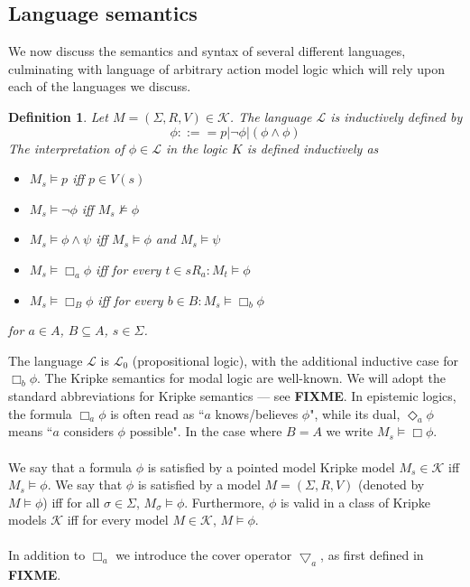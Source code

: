 \documentclass[12pt, a4paper, titlepage]{scrartcl}
\newtheorem{defn}{Definition}[subsection]
\numberwithin{equation}{section}
\newcommand{\cover}{\bigtriangledown}
\newcommand{\lang}{\mathcal{L}}
\newcommand{\langProp}{\lang_0}
\newcommand{\kripkeClass}{\mathcal{K}}
\newcommand{\FIXME}{{\bf FIXME}}
\begin{document}
\subsection{Language semantics}
We now discuss the semantics and syntax of several different languages, culminating with language of
arbitrary action model logic which will rely upon each of the languages we discuss.

\begin{defn} \label{modalLogic}
Let $M = (\Sigma, R, V) \in \kripkeClass$.
The language $\lang$ is inductively defined by
\[
	\phi ::== p | \neg \phi | (\phi \land \phi)
\]
The interpretation of $\phi \in \lang$ in the logic $K$ is defined inductively as
\begin{itemize}
	\item $M_s \models p$ iff $p \in V(s)$
	\item $M_s \models \neg \phi$ iff $M_s \not \models \phi$
	\item $M_s \models \phi \land \psi$ iff $M_s \models \phi$ and $M_s \models \psi$
	\item $M_s \models \Box_a \phi$ iff for every $t \in s R_a: M_t \models \phi$
	\item $M_s \models \Box_B \phi$ iff for every $b \in B : M_s \models \Box_b \phi$
\end{itemize}
for $a \in A$, $B \subseteq A$, $s \in \Sigma$.
\end{defn}
The language $\lang$ is $\langProp$ (propositional logic), with the additional inductive case for
$\Box_b \phi$.
The Kripke semantics for modal logic are well-known.
We will adopt the standard abbreviations for Kripke semantics --- see \FIXME.
In epistemic logics, the formula $\Box_a \phi$ is often read as ``$a$ knows/believes $\phi$", while
its dual, $\Diamond_a \phi$ means ``$a$ considers $\phi$ possible".
In the case where $B = A$ we write $M_s \models \Box \phi$.\\
\\
We say that a formula $\phi$ is satisfied by a pointed model Kripke model $M_s \in \kripkeClass$ iff
$M_s \models \phi$.
We say that $\phi$ is satisfied by a model $M = (\Sigma, R, V)$ (denoted by $M \models \phi$) iff
for all $\sigma \in \Sigma$, $M_\sigma \models \phi$.
Furthermore, $\phi$ is valid in a class of Kripke models $\kripkeClass$ iff for every model $M \in
\kripkeClass$, $M \models \phi$.\\
\\
In addition to $\Box_a$ we introduce the cover operator $\cover_a$, as first defined in \FIXME.
\end{document}
